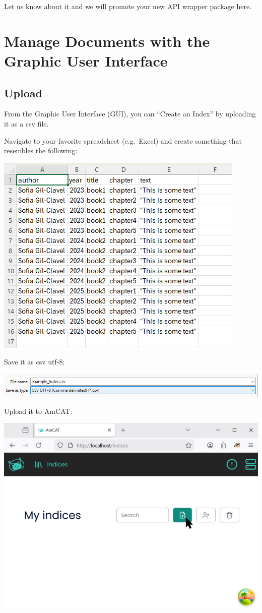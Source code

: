 \documentclass[
  letterpaper,
  DIV=11,
  numbers=noendperiod]{scrreprt}
\begin{document}
Let us know about it and we will promote your new API wrapper package
here.

\section{Manage Documents with the Graphic User
Interface}\label{manage-documents-with-the-graphic-user-interface}

\subsection{Upload}\label{upload}

From the Graphic User Interface (GUI), you can ``Create an Index'' by
uploading it as a csv file.

Navigate to your favorite spreadsheet (e.g.~Excel) and create something
that resembles the following:

\includegraphics{media/amcat-3.1-1.png}

Save it as csv utf-8:

\includegraphics{media/amcat-3.1-2.png}

Upload it to AmCAT:

\includegraphics{media/amcat-3.1-3.png}
\end{document}
